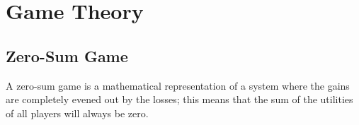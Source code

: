 \section{Game Theory}
\label{sec:background:game_theory}

\subsection{Zero-Sum Game}
\label{subsec:background:game_theory_zero_sum_game}

A zero-sum game is a mathematical representation of a system where the gains are completely evened out by the losses; this means that the sum of the utilities of all players will always be zero.